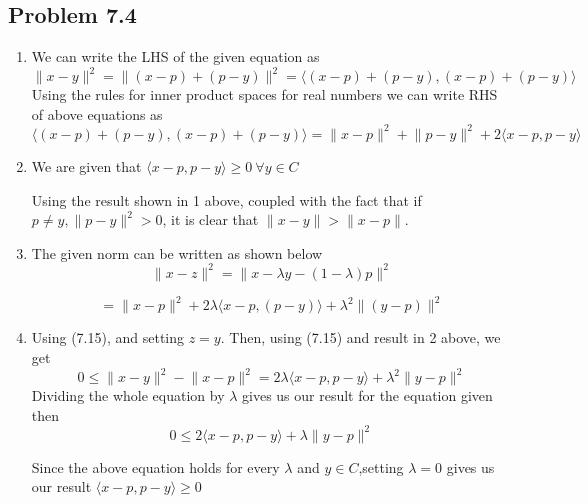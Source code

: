 \documentclass[letterpaper,12pt]{article}
\theoremstyle{definition}
\begin{document}
\subsection*{Problem 7.4}
\begin{enumerate}
    \item We can write the LHS of the given equation as
    \begin{equation*}
\lVert x-y \rVert^2 = \lVert (x-p)+(p-y) \rVert^2 = \langle (x-p)+(p-y), (x-p)+(p-y)\rangle
\end{equation*}
Using the rules for inner product spaces for real numbers we can write RHS of above equations as  
\begin{equation*}
 \langle (x-p)+(p-y), (x-p)+(p-y)\rangle =  \lVert x-p \rVert^2 +\lVert p-y \rVert^2 +2\langle x-p,p-y\rangle
\end{equation*}

    \item
    We are given that $\langle x-p,p-y\rangle \geq0 \ \forall y \in C$ 
    
    Using the result shown in 1 above, coupled with the fact that if $p \ne y, \lVert p-y \rVert^2 > 0$, it is clear that $ \lVert x-y \rVert > \lVert x-p \rVert$.
    \item
    The given norm can be written as shown below
    \begin{equation*}
  \lVert x-z \rVert^2= \lVert x-\lambda y -(1-\lambda)p \rVert^2
  \end{equation*}
  
   \begin{equation*}
   =
 \lVert x-p \rVert^2 +  2\lambda \langle x-p,(p-y)\rangle + \lambda^2 \lVert (y - p)\rVert^2 
\end{equation*}

    \item
Using (7.15), and setting $z=y$. Then, using (7.15) and result in 2 above, we get
\begin{equation*}
0 \leq \lVert x-y\rVert^2 - \lVert x-p\rVert^2 = 2\lambda \langle x-p, p-y\rangle + \lambda^2 \lVert y-p\rVert^2
\end{equation*}
Dividing the whole equation by $\lambda$ gives us our result for the equation given then 
\begin{equation*}
    0 \leq 2 \langle x-p,p-y \rangle + \lambda \lVert y-p \rVert^2 
\end{equation*}

Since the above equation holds for every $\lambda$ and $y \in C$,setting $\lambda=0$ gives us our result  $\langle x-p,p-y \rangle \geq 0$
\end{enumerate}
\end{document}
